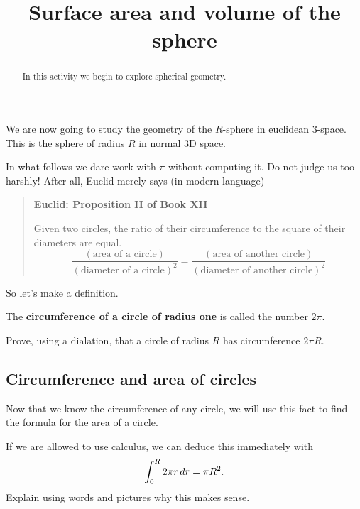 \documentclass[hints,handout,noauthor,nooutcomes,12pt]{ximera}
\title{Surface area and volume of the sphere}
\begin{document}
\begin{abstract}
In this activity we begin to explore spherical geometry.
\end{abstract}
\maketitle


We are now going to study the geometry of the $R$-sphere in euclidean
$3$-space. This is the sphere of radius $R$ in normal $3$D space.



In what follows we dare work with $\pi$ without computing it. Do not
judge us too harshly! After all, Euclid merely says (in modern language)
\begin{quote}
  \textbf{Euclid: Proposition II of Book XII}
  
  Given two circles, the ratio of their circumference to the square of
  their diameters are equal.
  \[
  \frac{(\text{area of a circle})}{(\text{diameter of a circle})^2} =
  \frac{(\text{area of another circle})}{(\text{diameter of another
      circle})^2}
  \]
\end{quote}

So let's make a definition.

\begin{definition}
  The \textbf{circumference of a circle of radius one} is called the number $2\pi$.
\end{definition}


\begin{problem}
  Prove, using a dialation, that a circle of radius $R$ has
  circumference $2\pi R$.
\end{problem}



\subsection{Circumference and area of circles}

Now that we know the circumference of any circle, we will use this
fact to find the formula for the area of a circle. 

\begin{problem}
  If we are allowed to use calculus, we can deduce this immediately with
  \[
  \int_0^R 2\pi r \,d r = \pi R^2.
  \]
  Explain using words and pictures why this makes sense.
\end{problem}
\end{document}
